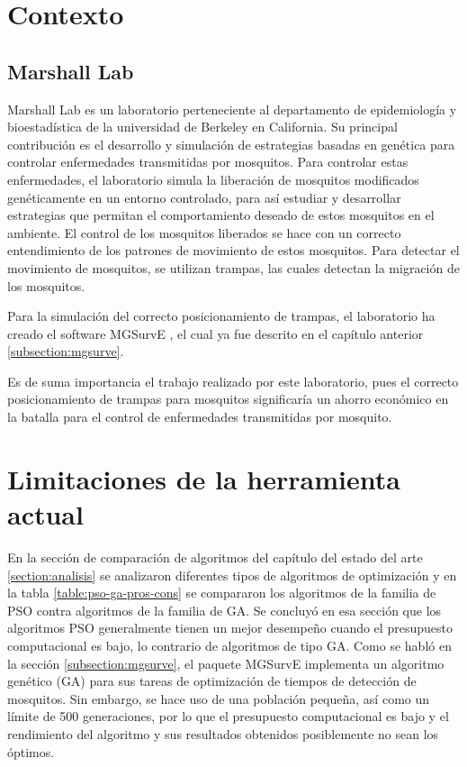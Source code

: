 \section{Contexto}
  \subsection{Marshall Lab}
  Marshall Lab \cite{MarshallLab} es un laboratorio perteneciente al
  departamento de epidemiología y bioestadística de la universidad de Berkeley
  en California. Su principal contribución es el desarrollo y simulación de
  estrategias basadas en genética para controlar enfermedades transmitidas por
  mosquitos. Para controlar estas enfermedades, el laboratorio simula la
  liberación de mosquitos modificados genéticamente en un entorno controlado,
  para así estudiar y desarrollar estrategias que permitan el comportamiento
  deseado de estos mosquitos en el ambiente. El control de los mosquitos
  liberados se hace con un correcto entendimiento de los patrones de
  movimiento de estos mosquitos. Para detectar el movimiento de mosquitos, se
  utilizan trampas, las cuales detectan la migración de los mosquitos.

  Para la simulación del correcto posicionamiento de trampas, el laboratorio
  ha creado el software MGSurvE \cite{MGSurvE}, el cual ya fue descrito en el
  capítulo anterior \ref{subsection:mgsurve}.

  Es de suma importancia el trabajo realizado por este laboratorio, pues el
  correcto posicionamiento de trampas para mosquitos significaría un ahorro
  económico en la batalla para el control de enfermedades transmitidas por
  mosquito.

\section{Limitaciones de la herramienta actual}
  En la sección de comparación de algoritmos del capítulo del
  estado del arte
  \ref{section:analisis} se analizaron diferentes tipos de algoritmos de
  optimización y en la tabla \ref{table:pso-ga-pros-cons} se compararon los
  algoritmos de la familia de PSO contra algoritmos de la familia de GA. Se
  concluyó en esa sección que los algoritmos PSO generalmente tienen un mejor
  desempeño cuando el presupuesto computacional es bajo, lo contrario de
  algoritmos de tipo GA. Como se habló en la sección \ref{subsection:mgsurve},
  el paquete MGSurvE implementa un algoritmo genético (GA) para sus tareas de
  optimización de tiempos de detección de mosquitos. Sin embargo, se hace uso
  de una población pequeña, así como un límite de 500 generaciones, por lo que
  el presupuesto computacional es bajo y el rendimiento del algoritmo y sus
  resultados obtenidos posiblemente no sean los óptimos.

